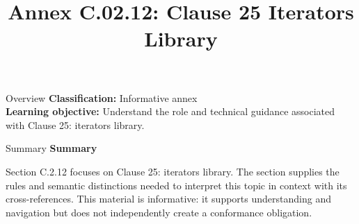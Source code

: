 \documentclass[10pt,letterpaper]{article}
\title{Annex C.02.12: Clause 25 Iterators Library}
\author{}
\date{}
\begin{document}
\maketitle
\begin{CornellOverviewBox}{Overview}
\textbf{Classification:} Informative annex\\[2pt]
\textbf{Learning objective:} Understand the role and technical guidance associated with Clause 25: iterators library.
\end{CornellOverviewBox}\begin{CornellSummaryBox}{Summary}
{\sffamily\bfseries\color{Accent} Summary}\par\vspace{3pt}Section C.2.12 focuses on Clause 25: iterators library. The section supplies the rules and semantic distinctions needed to interpret this topic in context with its cross-references. This material is informative: it supports understanding and navigation but does not independently create a conformance obligation.
\end{CornellSummaryBox}
\end{document}
